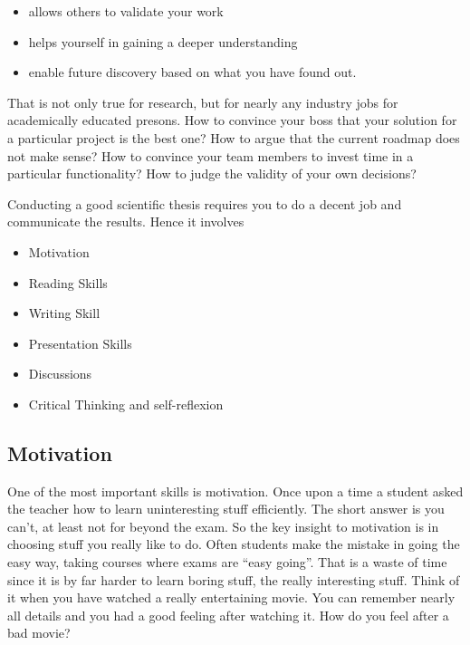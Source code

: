 \begin{itemize}
	\item allows others to validate your work
	\item helps yourself in gaining a deeper understanding
	\item enable future discovery based on what you have found out.
\end{itemize}

That is not only true for research, but for nearly any industry jobs for academically educated presons. How to convince your boss that your solution for a particular project is the best one? How to argue that the current roadmap does not make sense? How to convince your team members to invest time in a particular functionality? How to judge the validity of your own decisions?

Conducting a good scientific thesis requires you to do a decent job and communicate the results. Hence it involves

\begin{itemize}
	\item Motivation
	\item Reading Skills
	\item Writing Skill
	\item Presentation Skills
	\item Discussions
	\item Critical Thinking and self-reflexion
\end{itemize}




\subsection{Motivation}
One of the most important skills is motivation. Once upon a time a student asked the teacher how to learn uninteresting stuff efficiently. The short answer is you can’t, at least not for beyond the exam. So the key insight to motivation is in choosing stuff you really like to do. Often students make the mistake in going the easy way, taking courses where exams are “easy going”. That is a waste of time since it is by far harder to learn boring stuff, the really interesting stuff. Think of it when you have watched a really entertaining movie. You can remember nearly all details and you had a good feeling after watching it. How do you feel after a bad movie?


